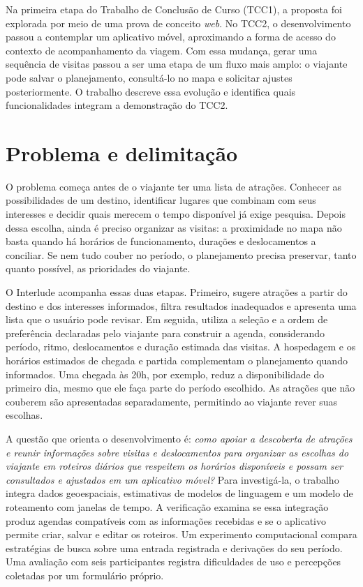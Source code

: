 Na primeira etapa do Trabalho de Conclusão de Curso (TCC1), a proposta foi explorada por meio de uma prova de conceito \textit{web}. No TCC2, o desenvolvimento passou a contemplar um aplicativo móvel, aproximando a forma de acesso do contexto de acompanhamento da viagem. Com essa mudança, gerar uma sequência de visitas passou a ser uma etapa de um fluxo mais amplo: o viajante pode salvar o planejamento, consultá-lo no mapa e solicitar ajustes posteriormente. O trabalho descreve essa evolução e identifica quais funcionalidades integram a demonstração do TCC2.

\section{Problema e delimitação}

O problema começa antes de o viajante ter uma lista de atrações. Conhecer as possibilidades de um destino, identificar lugares que combinam com seus interesses e decidir quais merecem o tempo disponível já exige pesquisa. Depois dessa escolha, ainda é preciso organizar as visitas: a proximidade no mapa não basta quando há horários de funcionamento, durações e deslocamentos a conciliar. Se nem tudo couber no período, o planejamento precisa preservar, tanto quanto possível, as prioridades do viajante.

O Interlude acompanha essas duas etapas. Primeiro, sugere atrações a partir do destino e dos interesses informados, filtra resultados inadequados e apresenta uma lista que o usuário pode revisar. Em seguida, utiliza a seleção e a ordem de preferência declaradas pelo viajante para construir a agenda, considerando período, ritmo, deslocamentos e duração estimada das visitas. A hospedagem e os horários estimados de chegada e partida complementam o planejamento quando informados. Uma chegada às 20h, por exemplo, reduz a disponibilidade do primeiro dia, mesmo que ele faça parte do período escolhido. As atrações que não couberem são apresentadas separadamente, permitindo ao viajante rever suas escolhas.

A questão que orienta o desenvolvimento é: \textit{como apoiar a descoberta de atrações e reunir informações sobre visitas e deslocamentos para organizar as escolhas do viajante em roteiros diários que respeitem os horários disponíveis e possam ser consultados e ajustados em um aplicativo móvel?} Para investigá-la, o trabalho integra dados geoespaciais, estimativas de modelos de linguagem e um modelo de roteamento com janelas de tempo. A verificação examina se essa integração produz agendas compatíveis com as informações recebidas e se o aplicativo permite criar, salvar e editar os roteiros. Um experimento computacional compara estratégias de busca sobre uma entrada registrada e derivações do seu período. Uma avaliação com seis participantes registra dificuldades de uso e percepções coletadas por um formulário próprio.

